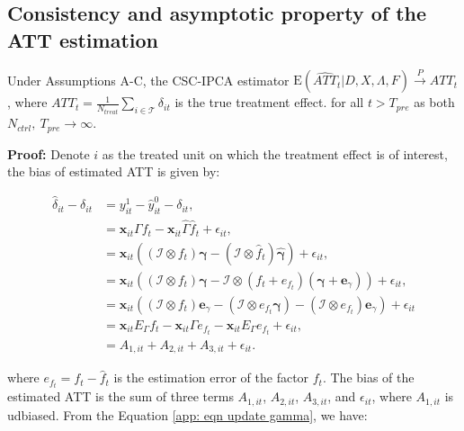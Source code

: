 \documentclass[12pt]{article}
\begin{document}
\subsection{Consistency and asymptotic property of the ATT estimation}
\begin{theorem}
\label{thm: bias}
Under Assumptions A-C, the CSC-IPCA estimator $\mathrm{E}\left(\widehat{ATT}_{t} | D, X, \Lambda, F\right) \xrightarrow{P} ATT_{t}$, where $ATT_{t} = \frac{1}{N_{treat}}\sum_{i \in \mathcal{T}}\delta_{it}$ is the true treatment effect. for all $t > T_{pre}$ as both $N_{ctrl}, \ T_{pre} \to \infty$.
\end{theorem}

\textbf{Proof:} Denote $i$ as the treated unit on which the treatment effect is of interest, the bias of estimated ATT is given by:

\begin{equation}
\begin{aligned}
\hat{\delta}_{it} - \delta_{it} &= y_{it}^1 - \hat{y}_{it}^0 - \delta_{it}, \\    
&= \textbf{x}_{it}\Gamma f_t - \textbf{x}_{it}\hat{\Gamma}\hat{f}_t + \epsilon_{it}, \\
&= \textbf{x}_{it}\left( \left(\mathcal{I}\otimes f_t \right) \bm{\gamma} - (\mathcal{I}\otimes \hat{f}_t ) \hat{\bm{\gamma}} \right) + \epsilon_{it}, \\
&= \textbf{x}_{it}\left( \left(\mathcal{I}\otimes f_t \right) \bm{\gamma} - \mathcal{I}\otimes (f_t + e_{f_t}) (\bm{\gamma}+\textbf{e}_{\gamma}) \right) + \epsilon_{it}, \\
&= \textbf{x}_{it}\left( (\mathcal{I} \otimes f_t) \textbf{e}_{\gamma} - (\mathcal{I} \otimes e_{f_t} \bm{\gamma}) - (\mathcal{I} \otimes e_{f_t}) \textbf{e}_{\gamma} \right) + \epsilon_{it}\\
&= \textbf{x}_{it}E_{\Gamma}f_t - \textbf{x}_{it}\Gamma e_{f_t} - \textbf{x}_{it}E_{\Gamma}e_{f_t} + \epsilon_{it}, \\
&= A_{1,it} + A_{2,it} + A_{3,it} + \epsilon_{it}.
\end{aligned}
\end{equation}

\noindent where $e_{f_t} = f_t - \hat{f}_t$ is the estimation error of the factor $f_t$. The bias of the estimated ATT is the sum of three terms $A_{1,it}$, $A_{2,it}$, $A_{3,it}$, and $\epsilon_{it}$, where $A_{1,it}$ is udbiased. From the Equation \ref{app: eqn update gamma}, we have:
\end{document}
